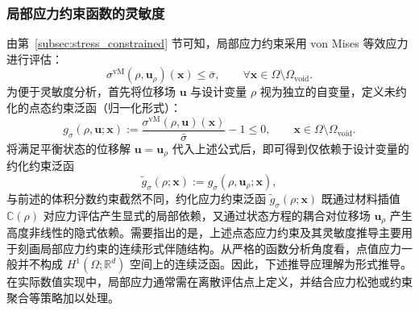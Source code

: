 \subsubsection*{局部应力约束函数的灵敏度}

由第~\ref{subsec:stress_constrained} 节可知，局部应力约束采用 von Mises 等效应力进行评估：
\[
\sigma^{\mathrm{vM}}(\rho, \boldsymbol{u}_\rho)(\boldsymbol{x}) \le \bar{\sigma}, \qquad  \forall \boldsymbol{x}\in \Omega\setminus\Omega_{\mathrm{void}}.
\]
为便于灵敏度分析，首先将位移场 $\boldsymbol{u}$ 与设计变量 $\rho$ 视为独立的自变量，定义未约化的点态约束泛函（归一化形式）：
\[
g_\sigma(\rho, \boldsymbol{u}; \boldsymbol{x}) := \frac{\sigma^{\mathrm{vM}}(\rho, \boldsymbol{u})(\boldsymbol{x})}{\bar{\sigma}} - 1 \le 0, \qquad \boldsymbol{x}\in \Omega\setminus\Omega_{\mathrm{void}}.
\]
将满足平衡状态的位移解 $\boldsymbol{u} = \boldsymbol{u}_\rho$ 代入上述公式后，即可得到仅依赖于设计变量的约化约束泛函
\[
\tilde g_\sigma(\rho;\boldsymbol{x}) := g_\sigma(\rho,\boldsymbol{u}_\rho;\boldsymbol{x}),
\]
与前述的体积分数约束截然不同，约化应力约束泛函 $\tilde{g}_\sigma(\rho; \boldsymbol{x})$ 既通过材料插值 $\mathbb{C}(\rho)$ 对应力评估产生显式的局部依赖，又通过状态方程的耦合对位移场 $\boldsymbol{u}_\rho$ 产生高度非线性的隐式依赖。需要指出的是，上述点态应力约束及其灵敏度推导主要用于刻画局部应力约束的连续形式伴随结构。从严格的函数分析角度看，点值应力一般并不构成 $H^1(\Omega;\mathbb{R}^d)$ 空间上的连续泛函。因此，下述推导应理解为形式推导。在实际数值实现中，局部应力通常需在离散评估点上定义，并结合应力松弛或约束聚合等策略加以处理。

